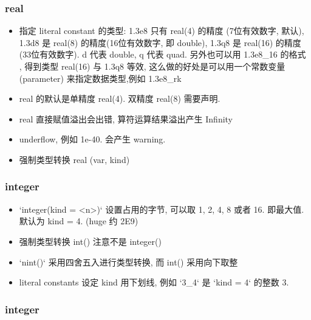 \subsubsection{real}
\begin{itemize}
\item 指定 literal constant 的类型: 1.3e8 只有 real(4) 的精度 (7位有效数字, 默认), 1.3d8 是 real(8) 的精度(16位有效数字, 即 double), 1.3q8 是 real(16) 的精度(33位有效数字). d 代表 double, q 代表 quad. 另外也可以用 1.3e8_16 的格式 , 得到类型  real(16) 与 1.3q8 等效, 这么做的好处是可以用一个常数变量 (parameter) 来指定数据类型,例如 1.3e8_rk 
\item real 的默认是单精度 real(4). 双精度 real(8) 需要声明.
\item real 直接赋值溢出会出错, 算符运算结果溢出产生 Infinity
\item underflow, 例如 1e-40. 会产生 warning.
\item 强制类型转换 real (var, kind)
\end{itemize}

\subsubsection{integer}
\begin{itemize}
\item `integer(kind = <n>)` 设置占用的字节, 可以取 1, 2, 4, 8 或者 16. 即最大值. 默认为 
   kind = 4. (huge 约 2E9)
\item 强制类型转换 int() 注意不是 integer()
\item `nint()` 采用四舍五入进行类型转换, 而 int() 采用向下取整
\item literal constants 设定 kind 用下划线, 例如 `3_4` 是 `kind = 4` 的整数 3.
\end{itemize}

\subsubsection{integer}